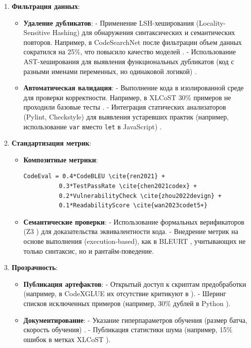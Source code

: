 \documentclass[14pt]{article}
\theoremstyle{definition}
\begin{document}
\begin{enumerate}
    \item \textbf{Фильтрация данных}:
    \begin{itemize}
        \item \textbf{Удаление дубликатов}: 
        - Применение LSH-хеширования (Locality-Sensitive Hashing) для обнаружения синтаксических и семантических повторов. Например, в CodeSearchNet \cite{husain2019codesearchnet} после фильтрации объем данных сократился на 25\%, что повысило качество моделей \cite{chen2023}. 
        - Использование AST-хеширования для выявления функциональных дубликатов (код с разными именами переменных, но одинаковой логикой) \cite{allamanis2019adverse}.
        \item \textbf{Автоматическая валидация}: 
        - Выполнение кода в изолированной среде для проверки корректности. Например, в XLCoST \cite{zhu2022} 30\% примеров не проходили базовые тесты \cite{liu2022survey}.
        - Интеграция статических анализаторов (Pylint, Checkstyle) для выявления устаревших практик (например, использование \texttt{var} вместо \texttt{let} в JavaScript) \cite{wan2023codet5+}.
    \end{itemize}

    \item \textbf{Стандартизация метрик}:
    \begin{itemize}
        \item \textbf{Композитные метрики}:
        \begin{verbatim}
CodeEval = 0.4*CodeBLEU \cite{ren2021} + 
          0.3*TestPassRate \cite{chen2021codex} + 
          0.2*VulnerabilityCheck \cite{zhou2022devign} + 
          0.1*ReadabilityScore \cite{wan2023codet5+}
        \end{verbatim}
        \item \textbf{Семантические проверки}: 
        - Использование формальных верификаторов (Z3 \cite{zaheer2020bigbird}) для доказательства эквивалентности кода.
        - Внедрение метрик на основе выполнения (execution-based), как в BLEURT \cite{bleurt}, учитывающих не только синтаксис, но и рантайм-поведение.
    \end{itemize}

    \item \textbf{Прозрачность}:
    \begin{itemize}
        \item \textbf{Публикация артефактов}: 
        - Открытый доступ к скриптам предобработки (например, в CodeXGLUE \cite{codexglue_repo} их отсутствие критикуют в \cite{feng2023}).
        - Шеринг списков исключенных примеров (например, 30\% дублей в Python \cite{chen2023}).
        \item \textbf{Документирование}: 
        - Указание гиперпараметров обучения (размер батча, скорость обучения) \cite{feng2020codebert}.
        - Публикация статистики шума (например, 15\% ошибок в метках XLCoST \cite{zhu2022}).
    \end{itemize}
\end{enumerate}
\end{document}
